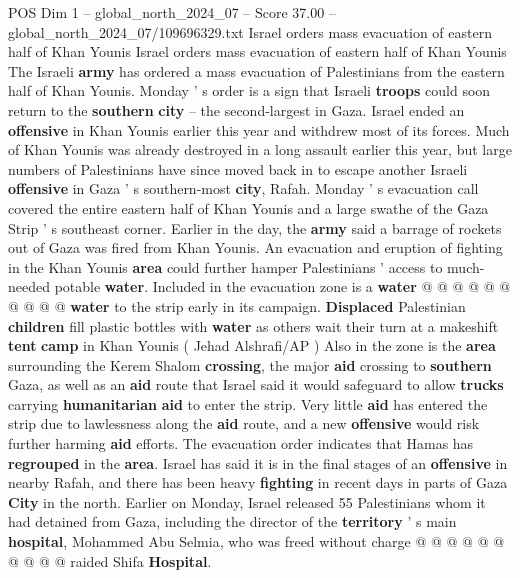 \begin{textsample}{POS Dim 1 – global\_north\_2024\_07 – Score 37.00 – global\_north\_2024\_07/109696329.txt}  \label{ex:f1_pos_381}
Israel orders mass evacuation of eastern half of Khan Younis Israel orders mass evacuation of eastern half of Khan Younis The Israeli \textbf{army} has ordered a mass evacuation of Palestinians from the eastern half of Khan Younis.
Monday ' s order is a sign that Israeli \textbf{troops} could soon return to the \textbf{southern} \textbf{city} -- the second-largest in Gaza.
Israel ended an \textbf{offensive} in Khan Younis earlier this year and withdrew most of its forces.
Much of Khan Younis was already destroyed in a long assault earlier this year, but large numbers of Palestinians have since moved back in to escape another Israeli \textbf{offensive} in Gaza ' s southern-most \textbf{city}, Rafah.
Monday ' s evacuation call covered the entire eastern half of Khan Younis and a large swathe of the Gaza Strip ' s southeast corner.
Earlier in the day, the \textbf{army} said a barrage of rockets out of Gaza was fired from Khan Younis.
An evacuation and eruption of fighting in the Khan Younis \textbf{area} could further hamper Palestinians ' access to much-needed potable \textbf{water}.
Included in the evacuation zone is a \textbf{water} @ @ @ @ @ @ @ @ @ @ \textbf{water} to the strip early in its campaign. \textbf{Displaced} Palestinian \textbf{children} fill plastic bottles with \textbf{water} as others wait their turn at a makeshift \textbf{tent} \textbf{camp} in Khan Younis ( Jehad Alshrafi/AP ) Also in the zone is the \textbf{area} surrounding the Kerem Shalom \textbf{crossing}, the major \textbf{aid} crossing to \textbf{southern} Gaza, as well as an \textbf{aid} route that Israel said it would safeguard to allow \textbf{trucks} carrying \textbf{humanitarian} \textbf{aid} to enter the strip.
Very little \textbf{aid} has entered the strip due to lawlessness along the \textbf{aid} route, and a new \textbf{offensive} would risk further harming \textbf{aid} efforts.
The evacuation order indicates that Hamas has \textbf{regrouped} in the \textbf{area}.
Israel has said it is in the final stages of an \textbf{offensive} in nearby Rafah, and there has been heavy \textbf{fighting} in recent days in parts of Gaza \textbf{City} in the north.
Earlier on Monday, Israel released 55 Palestinians whom it had detained from Gaza, including the director of the \textbf{territory} ' s main \textbf{hospital}, Mohammed Abu Selmia, who was freed without charge @ @ @ @ @ @ @ @ @ @ raided Shifa \textbf{Hospital}.

\end{textsample}
